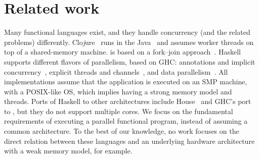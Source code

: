 

\section{Related work}
\label{s:concurrency:related}



Many functional languages exist, and they handle concurrency (and the related problems) differently.
Clo\textit{j}ure~\cite{clojure} runs in the Java~ and assumes worker threads on top of a shared-memory machine.
 is based on a fork--join approach~\cite{grelck:sac}.
Haskell supports different flavors of parallelism, based on \ac{GHC}: annotations and implicit concurrency~\cite{marlow:multicore_haskell}, explicit threads and channels~\cite{jones:conc_haskell}, and data parallelism~\cite{chakravarty:dp_haskell}.
All implementations assume that the application is executed on an \acs{SMP} machine, with a \ac{POSIX}-like \ac{OS}, which implies having a strong memory model and threads.
Ports of Haskell to other architectures include House~\cite{house} and \ac{GHC}'s port to , but they do not support multiple cores.
We focus on the fundamental requirements of executing a parallel functional program, instead of assuming a common architecture.
To the best of our knowledge, no work focuses on the direct relation between these languages and an underlying hardware architecture with a weak memory model, for example.

